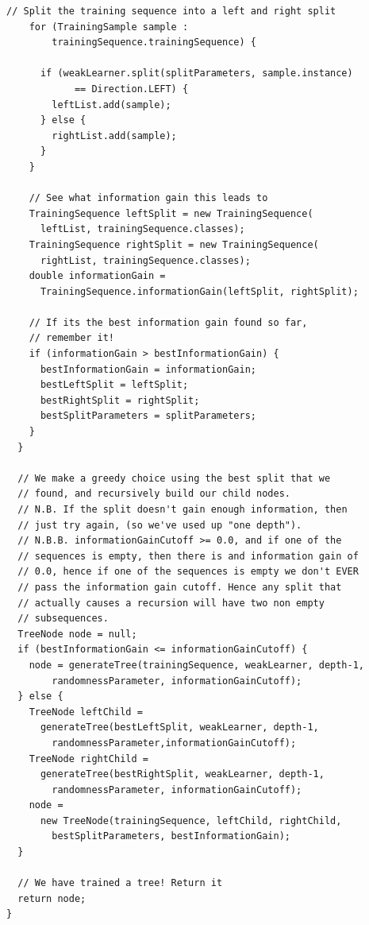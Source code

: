\documentclass[12pt,twoside,notitlepage]{report}
\begin{document}
\begin{lstlisting}[caption={The implementation code for tree generation.}, label={lst:actualGenerateTree}]
    // Split the training sequence into a left and right split
    for (TrainingSample sample : 
        trainingSequence.trainingSequence) {

      if (weakLearner.split(splitParameters, sample.instance) 
            == Direction.LEFT) {
        leftList.add(sample);
      } else {
        rightList.add(sample);
      }
    }
    
    // See what information gain this leads to
    TrainingSequence leftSplit = new TrainingSequence(
      leftList, trainingSequence.classes);
    TrainingSequence rightSplit = new TrainingSequence(
      rightList, trainingSequence.classes);
    double informationGain = 
      TrainingSequence.informationGain(leftSplit, rightSplit);
    
    // If its the best information gain found so far, 
    // remember it!
    if (informationGain > bestInformationGain) {
      bestInformationGain = informationGain;
      bestLeftSplit = leftSplit;
      bestRightSplit = rightSplit;
      bestSplitParameters = splitParameters;
    }
  }
  
  // We make a greedy choice using the best split that we 
  // found, and recursively build our child nodes.
  // N.B. If the split doesn't gain enough information, then 
  // just try again, (so we've used up "one depth").
  // N.B.B. informationGainCutoff >= 0.0, and if one of the 
  // sequences is empty, then there is and information gain of 
  // 0.0, hence if one of the sequences is empty we don't EVER 
  // pass the information gain cutoff. Hence any split that 
  // actually causes a recursion will have two non empty 
  // subsequences.
  TreeNode node = null;
  if (bestInformationGain <= informationGainCutoff) {
    node = generateTree(trainingSequence, weakLearner, depth-1, 
        randomnessParameter, informationGainCutoff);
  } else {
    TreeNode leftChild = 
      generateTree(bestLeftSplit, weakLearner, depth-1, 
        randomnessParameter,informationGainCutoff);
    TreeNode rightChild = 
      generateTree(bestRightSplit, weakLearner, depth-1, 
        randomnessParameter, informationGainCutoff);
    node = 
      new TreeNode(trainingSequence, leftChild, rightChild, 
        bestSplitParameters, bestInformationGain);
  }
  
  // We have trained a tree! Return it
  return node;
}
    \end{lstlisting}
\end{document}
